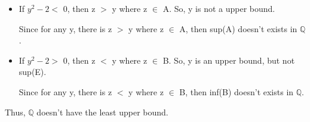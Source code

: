 	\begin{itemize}[leftmargin=1cm]
		\item If $ y^2-2 < $ 0, then z $>$ y where z $\in$ A.
			So, y is not a upper bound.

			Since for any y, there is z $>$ y where z $\in$ A, then sup(A) doesn't
			exists in $\mathbb{Q}$.
	
		\item If $ y^2-2 > $ 0, then z $<$ y where z $\in$ B.
			So, y is an upper bound, but not sup(E).

			Since for any y, there is z $<$ y where z $\in$ B, then inf(B) doesn't
			exists in $\mathbb{Q}$.
	\end{itemize}

	Thus, $\mathbb{Q}$ doesn't have the least upper bound.
